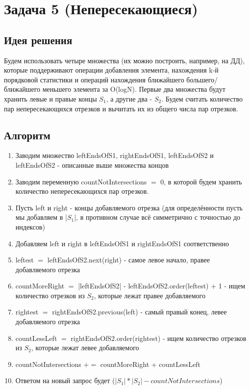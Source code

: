 \section{Задача 5 (Непересекающиеся)}
\subsection{Идея решения}
Будем использовать четыре множества (их можно построить, например, на ДД), которые поддерживают операции добавления элемента, нахождения k-й порядковой статистики и операций нахождения ближайшего большего/ближайшего меньшего элемента за O(logN). Первые два множества будут хранить левые и правые концы $S_1$, а другие два - $S_2$. Будем считать количество пар непересекающихся отрезков и вычитать их из общего числа пар отрезков.

\subsection{Алгоритм}
\begin{enumerate}
    \item Заводим множество leftEndsOfS1, rightEndsOfS1, leftEndsOfS2 и leftEndsOfS2 - описанные выше множества концов
    \item Заводим переменную countNotIntersections $=$ 0, в которой будем хранить количество непересекающихся пар отрезков.
    \item Пусть left и right - концы добавляемого отрезка (для определённости пусть мы добавляем в |$S_1$|, в противном случае всё симметрично с точностью до индексов)
    \item Добавляем left и right в leftEndsOfS1 и rightEndsOfS1 соответственно
    \item leftest $=$ leftEndsOfS2.next(right) - самое левое начало, правее добавляемого отрезка
    \item countMoreRight $=$ |leftEndsOfS2| -  leftEndsOfS2.order(leftest) + 1 - ищем количество отрезков из $S_2$, которые лежат правее добавляемого
    \item rightest $=$ rightEndsOfS2.previous(left) - самый правый конец, левее добавляемого отрезка
    \item countLessLeft $=$ rightEndsOfS2.order(rightest) - ищем количество отрезков из $S_2$, которые лежат левее добавляемого
    \item countNotIntersections $\mathrel{+}=$ countMoreRight + countLessLeft
    \item Ответом на новый запрос будет ($|S_1| * |S_2| - countNotIntersections$)
\end{enumerate}

